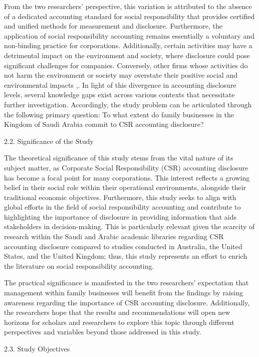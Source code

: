 \documentclass[10pt]{NSP1}
\begin{document}
From the two researchers' perspective, this variation is attributed to the absence of a dedicated accounting standard for social responsibility that provides certified and unified methods for measurement and disclosure. Furthermore, the application of social responsibility accounting remains essentially a voluntary and non-binding practice for corporations. Additionally, certain activities may have a detrimental impact on the environment and society, where disclosure could pose significant challenges for companies. Conversely, other firms whose activities do not harm the environment or society may overstate their positive social and environmental impacts \cite{ref35},. In light of this divergence in accounting disclosure levels, several knowledge gaps exist across various contexts that necessitate further investigation. Accordingly, the study problem can be articulated through the following primary question: To what extent do family businesses in the Kingdom of Saudi Arabia commit to CSR accounting disclosure?

2.2. Significance of the Study

The theoretical significance of this study stems from the vital nature of its subject matter, as Corporate Social Responsibility (CSR) accounting disclosure has become a focal point for many corporations. This interest reflects a growing belief in their social role within their operational environments, alongside their traditional economic objectives. Furthermore, this study seeks to align with global efforts in the field of social responsibility accounting and contribute to highlighting the importance of disclosure in providing information that aids stakeholders in decision-making. This is particularly relevant given the scarcity of research within the Saudi and Arabic academic libraries regarding CSR accounting disclosure compared to studies conducted in Australia, the United States, and the United Kingdom; thus, this study represents an effort to enrich the literature on social responsibility accounting.

The practical significance is manifested in the two researchers' expectation that management within family businesses will benefit from the findings by raising awareness regarding the importance of CSR accounting disclosure. Additionally, the researchers hope that the results and recommendations will open new horizons for scholars and researchers to explore this topic through different perspectives and variables beyond those addressed in this study.

2.3. Study Objectives
\end{document}
